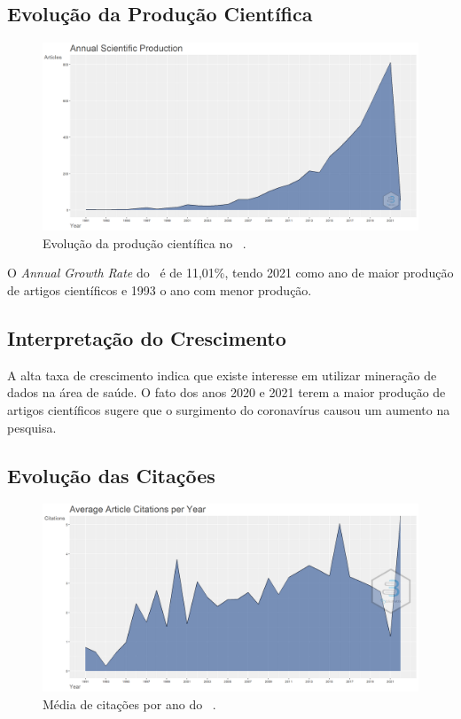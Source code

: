 \subsection{Evolução da Produção Científica}

\begin{figure}
    \centering
    \includegraphics[width=1\textwidth]{experiments/vinis-caixe/PesqBibliogr/MineracaoDados/WoS-20220204/Dataset/AnnualScientificProduction-2022-02-06.png}
    \caption{Evolução da produção científica no \dataset\ .}
    \label{fig:evol:anual:vinis-caixe}
\end{figure}

O \textit{Annual Growth Rate} do \dataset\ é de 11,01\%, tendo 2021 como ano de maior produção de artigos científicos e 1993 o ano com menor produção.

\subsection{Interpretação do Crescimento}

A alta taxa de crescimento indica que existe interesse em utilizar mineração de dados na área de saúde. O fato dos anos 2020 e 2021 terem a maior produção de artigos científicos sugere que o surgimento do coronavírus causou um aumento na pesquisa.

\subsection{Evolução das Citações}

\begin{figure}
    \centering
    \includegraphics[width=1\textwidth]{experiments/vinis-caixe/PesqBibliogr/MineracaoDados/WoS-20220204/Dataset/AverageArticleCitationPerYear-2022-02-08.png}
    \caption{Média de citações por ano do \dataset\ .}
    \label{fig:cit:anual:vinis-caixe}
\end{figure}

